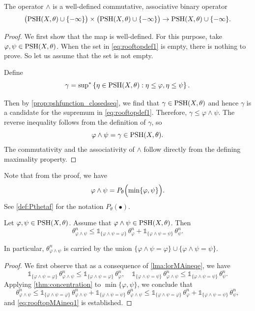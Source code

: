 \begin{proposition}\label{prop:land_well_def}
    The operator $\land$ is a well-defined commutative, associative binary operator
    \[
    \bigl(\mathrm{PSH}(X,\theta)\cup\{-\infty\}\bigr)\times\bigl(\mathrm{PSH}(X,\theta)\cup\{-\infty\}\bigr)\rightarrow \mathrm{PSH}(X,\theta)\cup\{-\infty\}.
    \]
\end{proposition}
\begin{proof}
    We first show that the map is well-defined. For this purpose, take $\varphi,\psi\in \mathrm{PSH}(X,\theta)$. When the set in \eqref{eq:rooftopdef1} is empty, there is nothing to prove. So let us assume that the set is not empty.

    Define
    \[
    \gamma=\operatorname*{sup}_{}{}\!{}^{*} \left\{\eta\in \mathrm{PSH}(X,\theta):\eta\leq \varphi,\eta\leq \psi\right\}.
    \]
    Then by \cref{prop:pshfunction_closedseq}, we find that $\gamma\in \mathrm{PSH}(X,\theta)$ and hence $\gamma$ is a candidate for the supremum in \eqref{eq:rooftopdef1}. Therefore, $\gamma\leq \varphi\land \psi$. The reverse inequality follows from the definition of $\gamma$, so
    \[
    \varphi\land \psi=\gamma\in \mathrm{PSH}(X,\theta).
    \]
    The commutativity and the associativity of $\land$ follow directly from the defining maximality property.
\end{proof}
Note that from the proof, we have
\[
\varphi\land \psi=P_{\theta}\Bigl( \min\{\varphi,\psi\} \Bigr).
\]
See \cref{def:Pthetaf} for the notation $P_{\theta}(\bullet)$.


\begin{lemma}\label{lma:rooftopMA}
    Let $\varphi,\psi\in \mathrm{PSH}(X,\theta)$. Assume that $\varphi\land\psi\in \mathrm{PSH}(X,\theta)$. Then
    \begin{equation}\label{eq:rooftopMAineq1}
    \theta_{\varphi\land \psi}^n\leq \mathds{1}_{\{\varphi\land\psi=\varphi\}}\, \theta_{\varphi}^n+\mathds{1}_{\{\varphi\land\psi=\psi\}} \,\theta_{\psi}^n.
    \end{equation}
\end{lemma}
In particular, $\theta_{\varphi\land \psi}^n$ is carried by the union $\{\varphi\land \psi=\varphi\}\cup \{\varphi\land \psi=\psi\}$.

\begin{proof}
We first observe that as a consequence of \cref{lma:lorMAineqe}, we have
\[
\mathds{1}_{\{\varphi\land \psi=\varphi\}} \,\theta_{\varphi\land \psi}^n\leq \mathds{1}_{\{\varphi\land \psi=\varphi\}} \,\theta_{\varphi}^n,\quad \mathds{1}_{\{\varphi\land \psi=\psi\}} \,\theta_{\varphi\land \psi}^n\leq \mathds{1}_{\{\varphi\land \psi=\psi\}} \,\theta_{\psi}^n.
\]
Applying \cref{thm:concentration} to $\min\{\varphi,\psi\}$, we conclude that
\[
\theta_{\varphi\land \psi}^n\leq \mathds{1}_{\{\varphi\land \psi=\varphi\}} \,\theta_{\varphi\land \psi}^n+\mathds{1}_{\{\varphi\land \psi=\psi\}}\,\theta_{\varphi\land \psi}^n\leq \mathds{1}_{\{\varphi\land\psi=\varphi\}} \,\theta_{\varphi}^n+\mathds{1}_{\{\varphi\land\psi=\psi\}} \,\theta_{\psi}^n,
\]
and \eqref{eq:rooftopMAineq1} is established.
\end{proof}



